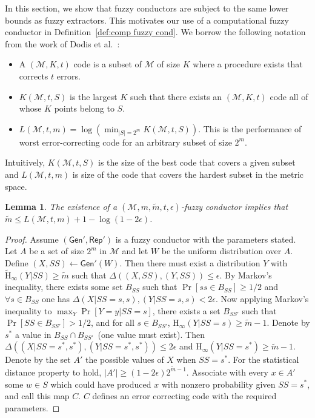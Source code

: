 \documentclass[11pt]{article}
\newcommand{\defref}[1]{\mbox{Definition~\ref{#1}}}
\newcommand{\class}[1]{{\ensuremath{\mathsf{#1}}}}
\newcommand{\gen}{\ensuremath{\class{Gen}}\xspace}
\newcommand{\rep}{\ensuremath{\class{Rep}}\xspace}
\newcommand{\Hoo}{\mathrm{H}_\infty}
\newcommand{\Hav}{\tilde{\mathrm{H}}_\infty}
\newtheorem{lemma}[theorem]{Lemma}
\begin{document}
\noindent In this section, we show that fuzzy conductors are subject to the same lower bounds as fuzzy extractors.  This motivates our use of a computational fuzzy conductor in \defref{def:comp fuzzy cond}.
We borrow the following notation from the work of Dodis et al.~\cite{DBLP:journals/siamcomp/DodisORS08}:
\begin{itemize}
\item A $(\mathcal{M}, K, t)$ code is a subset of $\mathcal{M}$ of size $K$ where a procedure exists that corrects $t$ errors.
\item $K(\mathcal{M}, t, S)$ is the largest $K$ such that there exists an $(\mathcal{M}, K, t)$ code all of whose $K$ points belong to $S$.
\item $L(\mathcal{M}, t, m) = \log (\min_{|S| = 2^m} K(\mathcal{M}, t, S))$.  This is the performance of worst error-correcting code for an arbitrary subset of size $2^m$.
\end{itemize}
Intuitively, $K(\mathcal{M}, t, S)$ is the size of the best code that covers a given subset and $L(\mathcal{M}, t, m)$ is size of the code that covers the hardest subset in the metric space.  
\begin{lemma}
The existence of a $(\mathcal{M}, m, \tilde{m}, t, \epsilon)$-fuzzy conductor implies that $\tilde{m}\leq L(\mathcal{M}, t, m) +1 -\log (1-2\epsilon)$.
\end{lemma}
\begin{proof}  Assume $(\gen', \rep')$ is a fuzzy conductor with the parameters stated.  Let $A$ be a set of size $2^m$ in $\mathcal{M}$ and let $W$ be the uniform distribution over $A$.  Define $(X,SS) \leftarrow \gen'(W)$.  Then there must exist a distribution $Y$ with $\Hav(Y|SS) \geq \tilde{m}$ such that $\Delta((X,SS), (Y, SS))\leq \epsilon$.  By Markov's inequality, there exists some set $B_{SS}$ such that $\Pr[ss\in B_{SS}] \geq 1/2$ and $\forall s\in B_{SS}$ one has $\Delta(X | SS = s, s ), (Y | SS = s, s)<2\epsilon$.  Now applying Markov's inequality to $\max_{Y} \Pr[Y=y | SS=s]$, there exists a set $B_{SS'}$ such that $\Pr[SS\in B_{SS'}]>1/2$, and for all $s\in B_{SS'}$, $\Hoo(Y| SS =s ) \geq \tilde{m}-1$.  Denote by $s^*$ a value in $B_{SS}\cap B_{SS'}$~(one value must exist).  Then $\Delta((X | SS =s^* , s^*), (Y| SS = s^*, s^*))\leq 2\epsilon$ and $\Hoo(Y|SS=s^*)\geq \tilde{m}-1$.  Denote by the set $A'$ the possible values of $X$ when $SS=s^*$.  For the statistical distance property to hold, $|A'| \geq  (1-2\epsilon)2^{\tilde{m}-1}$.  Associate with every $x\in A'$ some $w\in S$ which could have produced $x$ with nonzero probability given $SS=s^*$, and call this map $C$.  $C$ defines an error correcting code with the required parameters.
\end{proof}
\end{document}
